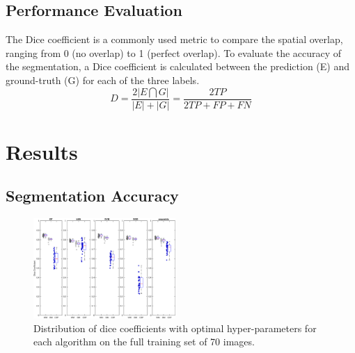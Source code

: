 \documentclass[journal]{IEEEtran}
\begin{document}
\subsection{Performance Evaluation}\label{ch.eval}
The Dice coefficient is a commonly used metric to compare the spatial overlap, ranging from 0 (no overlap) to 1 (perfect overlap). To evaluate the accuracy of the segmentation, a Dice coefficient is calculated between the prediction (E) and ground-truth (G) for each of the three labels. 
\begin{equation}
D = \frac{2|E \bigcap G|}{|E| + |G|} = \frac{2 TP}{2 TP + FP + FN}
\end{equation}

\section{Results}
\subsection{Segmentation Accuracy}
\begin{figure}
	\centering
	\includegraphics[width=0.48\textwidth]{images/boxplot}
	\caption{Distribution of dice coefficients with optimal hyper-parameters for each algorithm on the full training set of 70 images.}\label{f.boxplot}
\end{figure}
\end{document}
